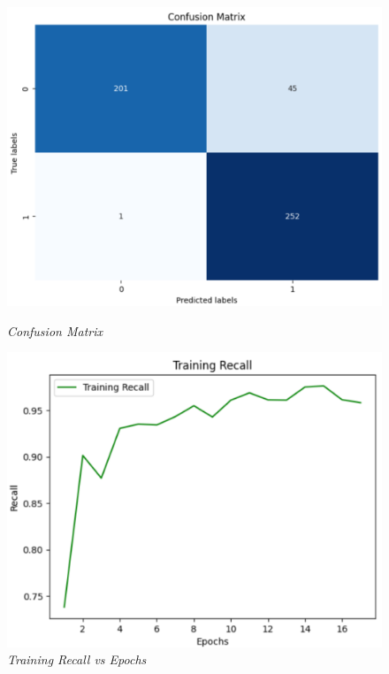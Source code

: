 \documentclass[12pt, a4paper]{report}
\begin{document}
\begin{figure}[htbp]
    \centering
    \begin{minipage}{0.4\textwidth}
        \centering
        \includegraphics[width=\linewidth]{report images/image32.png}
        \caption{\textit{Confusion Matrix}}
    \end{minipage}%
    \hspace{0.05\textwidth} %
    \begin{minipage}{0.4\textwidth}
        \centering
        \includegraphics[width=\linewidth]{report images/image33.png}
        \caption{\textit{Training Recall vs Epochs}}
    \end{minipage}
\end{figure}
\end{document}

